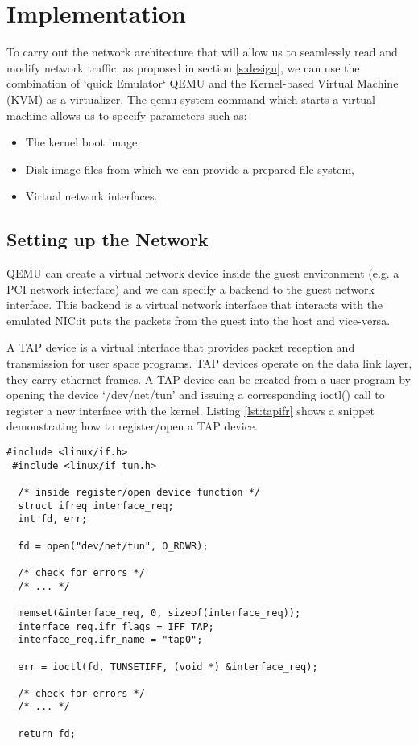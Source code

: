 \section{Implementation} %

To carry out the network architecture that will allow us to seamlessly read and modify
network traffic, as proposed in section \ref{s:design}, we can use the combination of
`quick Emulator` QEMU and the Kernel-based Virtual Machine (KVM) as a virtualizer. The qemu-system command which
starts a virtual machine allows us to specify parameters such as:
\begin{itemize}
  \item The kernel boot image,
  \item Disk image files from which we can provide a prepared file system, %
  \item Virtual network interfaces.
\end{itemize}

\subsection{Setting up the Network}

QEMU can create a virtual network device
inside the guest environment (e.g. a PCI network interface) and we can specify a backend to the
guest network interface. This backend is a virtual network interface that interacts with the
emulated NIC:\@ it puts the packets from the guest into the host and vice-versa\cite{DocumentationNetworkingQEMU}.

A TAP device is a virtual interface that provides packet reception and transmission for user space programs.
TAP devices operate on the data link layer, they carry ethernet frames.
A TAP device can be created from a user program by opening the device `/dev/net/tun'  and issuing a
corresponding ioctl() call to register a new interface with the kernel\cite{krasnyanskyUniversalTUNTAP}.
Listing \ref{lst:tapifr} shows a snippet demonstrating how to register/open a TAP device.

\begin{lstlisting}[caption={Registering/opening a virtual TAP interface}, label={lst:tapifr},  style=CStylespecial]
 #include <linux/if.h>
 #include <linux/if_tun.h>

  /* inside register/open device function */
  struct ifreq interface_req;
  int fd, err;

  fd = open("dev/net/tun", O_RDWR);

  /* check for errors */
  /* ... */

  memset(&interface_req, 0, sizeof(interface_req));
  interface_req.ifr_flags = IFF_TAP;
  interface_req.ifr_name = "tap0";

  err = ioctl(fd, TUNSETIFF, (void *) &interface_req);

  /* check for errors */
  /* ... */

  return fd;
\end{lstlisting}

